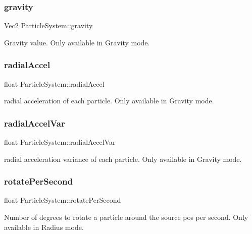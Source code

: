 \subsubsection{\texorpdfstring{gravity}{gravity}}
{\footnotesize\ttfamily \hyperlink{classVec2}{Vec2} Particle\+System\+::gravity}

Gravity value. Only available in \textquotesingle{}Gravity\textquotesingle{} mode. \mbox{\label{classParticleSystem_aad9eb3f8a37e03d92ec09d2146248ff5}} 
\subsubsection{\texorpdfstring{radial\+Accel}{radialAccel}}
{\footnotesize\ttfamily float Particle\+System\+::radial\+Accel}

radial acceleration of each particle. Only available in \textquotesingle{}Gravity\textquotesingle{} mode. \mbox{\label{classParticleSystem_aac80efb97ad54c4f23de9801661d4f9f}} 
\subsubsection{\texorpdfstring{radial\+Accel\+Var}{radialAccelVar}}
{\footnotesize\ttfamily float Particle\+System\+::radial\+Accel\+Var}

radial acceleration variance of each particle. Only available in \textquotesingle{}Gravity\textquotesingle{} mode. \mbox{\label{classParticleSystem_abc209d18b4cfab32d2ee47bbda8300c9}} 
\subsubsection{\texorpdfstring{rotate\+Per\+Second}{rotatePerSecond}}
{\footnotesize\ttfamily float Particle\+System\+::rotate\+Per\+Second}

Number of degrees to rotate a particle around the source pos per second. Only available in \textquotesingle{}Radius\textquotesingle{} mode. \mbox{\label{classParticleSystem_a3aa049ca97987019baed0d0bd959b18b}} 

